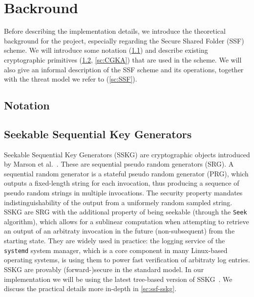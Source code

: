 \chapter{Backround}\label{ch:background}

Before describing the implementation details, we introduce the theoretical
background for the project, especially regarding the Secure Shared Folder 
(SSF) scheme. We will introduce some notation (\cref{sc:notation}) and
describe existing cryptographic primitives (\cref{sc:SSKG}, \cref{sc:CGKA})
that are used in the scheme.
We will also give an informal description of the SSF scheme and its operations,
together with the threat model we refer to (\cref{sc:SSF}).
 
\section{Notation}\label{sc:notation}


\section{Seekable Sequential Key Generators}\label{sc:SSKG}

Seekable Sequential Key Generators (SSKG) are cryptographic objects introduced by Marson et al.~\cite{ESORICS:MarPoe13}.
These are sequential pseudo random generators (SRG).
A sequential random generator is a stateful pseudo random generator (PRG), 
which outputs a fixed-length string for each invocation, 
thus producing a sequence of pseudo random strings in multiple invocations.
The security property mandates indistinguishability of the output from a uniformely random sampled string.
SSKG are SRG with the additional property of being seekable (through the \texttt{Seek} algorithm), 
which allows for a sublinear computation when attempting 
to retrieve an output of an arbitraty invocation in the future (non-subsequent)
from the starting state.
They are widely used in practice:
the logging service of the \texttt{systemd} system manager,
which is a core component in many Linux-based operating systems,
is using them to power fast verification of arbitraty log entries.
SSKG are provably (forward-)secure in the standard model.
In our implementation we will be using the latest tree-based version of SSKG~\cite{ESORICS:MarPoe14}.
We discuss the practical details more in-depth in \cref{sc:ssf-sskg}.

